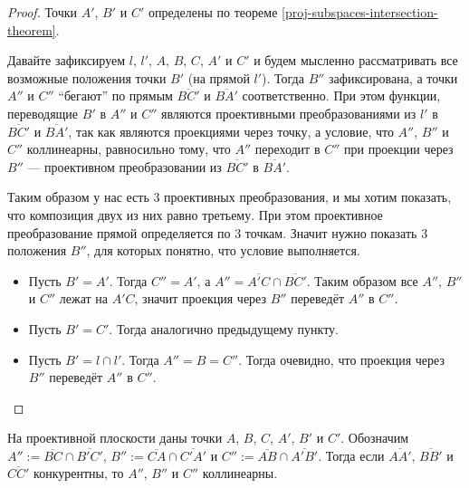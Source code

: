 \documentclass[12pt,a4paper]{article}
\begin{document}
    \begin{proof}
        Точки $A'$, $B'$ и $C'$ определены по теореме \ref{proj-subspaces-intersection-theorem}.

        Давайте зафиксируем $l$, $l'$, $A$, $B$, $C$, $A'$ и $C'$ и будем мысленно рассматривать все возможные положения точки $B'$ (на прямой $l'$). Тогда $B''$ зафиксирована, а точки $A''$ и $C''$ ``бегают'' по прямым $\overline{BC'}$ и $\overline{BA'}$ соответственно. При этом функции, переводящие $B'$ в $A''$ и $C''$ являются проективными преобразованиями из $l'$ в $\overline{BC'}$ и $\overline{BA'}$, так как являются проекциями через точку, а условие, что $A''$, $B''$ и $C''$ коллинеарны, равносильно тому, что $A''$ переходит в $C''$ при проекции через $B''$ --- проективном преобразовании из $\overline{BC'}$ в $\overline{BA'}$.

        Таким образом у нас есть 3 проективных преобразования, и мы хотим показать, что композиция двух из них равно третьему. При этом проективное преобразование прямой определяется по 3 точкам. Значит нужно показать 3 положения $B''$, для которых понятно, что условие выполняется.
        
        \begin{itemize}
            \item Пусть $B' = A'$. Тогда $C'' = A'$, а $A'' = \overline{A'C} \cap \overline{BC'}$. Таким образом все $A''$, $B''$ и $C''$ лежат на $A'C$, значит проекция через $B''$ переведёт $A''$ в $C''$.
            \item Пусть $B' = C'$. Тогда аналогично предыдущему пункту.
            \item Пусть $B' = l \cap l'$. Тогда $A'' = B = C''$. Тогда очевидно, что проекция через $B''$ переведёт $A''$ в $C''$.
        \end{itemize}
    \end{proof}

    \begin{theorem}
        На проективной плоскости даны точки $A$, $B$, $C$, $A'$, $B'$ и $C'$. Обозначим $A'' := \overline{BC} \cap \overline{B'C'}$, $B'' := \overline{CA} \cap \overline{C'A'}$ и $C'' := \overline{AB} \cap \overline{A'B'}$. Тогда если $\overline{AA'}$, $\overline{BB'}$ и $\overline{CC'}$ конкурентны, то $A''$, $B''$ и $C''$ коллинеарны.
    \end{theorem}
\end{document}
